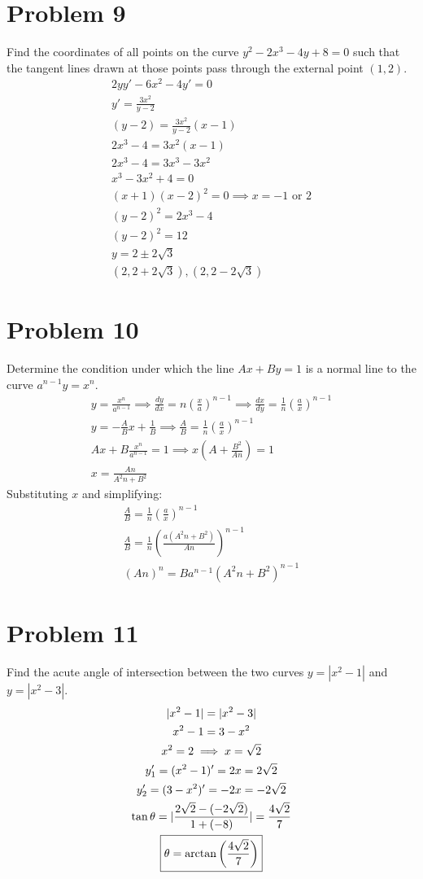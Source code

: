 \documentclass[12pt]{article}
\newcommand*{\paren}[1]{\ensuremath\left(#1\right)}
\newcommand{\dydx}{\frac{dy}{dx}}
\newcommand{\tor}{\text{ or }}
\newcommand{\problem}[1]{\section{Problem #1}}
\begin{document}
\problem{9}
Find the coordinates of all points on the curve $y^2-2x^3-4y+8=0$ such that the tangent lines drawn at those points pass through the external point $(1,2)$.
\begin{gather*}
    2yy'-6x^2-4y'=0\\
    y'=\frac{3x^2}{y-2}\\
    (y-2)=\frac{3x^2}{y-2}(x-1)\\
    2x^3-4=3x^2(x-1)\\
    2x^3-4=3x^3-3x^2\\
    x^3-3x^2+4=0\\ 
    (x+1)(x-2)^2=0 \implies x=-1 \tor 2\\
    (y-2)^2=2x^3-4\\
    (y-2)^2=12\\
    y=2\pm 2\sqrt{3}\\
    \boxed{(2, 2+2\sqrt{3}),(2,2-2\sqrt{3})}
\end{gather*}

\problem{10}
Determine the condition under which the line $Ax+By=1$ is a normal line to the curve $a^{n-1}y=x^n$.
\begin{gather*}
    y=\frac{x^n}{a^{n-1}} \implies \dydx = n(\frac{x}{a})^{n-1}\implies \frac{dx}{dy}=\frac{1}{n} (\frac{a}{x})^{n-1}\\
    y=-\frac{A}{B}x+\frac{1}{B} \implies \frac{A}{B}=\frac{1}{n} (\frac{a}{x})^{n-1}\\
    Ax+B\frac{x^n}{a^{n-1}}=1 \implies x(A+\frac{B^2}{An})=1\\
    x=\frac{An}{A^2n+B^2}
\end{gather*}
Substituting $x$ and simplifying:
\begin{gather*}
    \frac{A}{B}=\frac{1}{n} (\frac{a}{x})^{n-1}\\
    \frac{A}{B}=\frac{1}{n} (\frac{a(A^2n+B^2)}{An})^{n-1}\\
    \boxed{(An)^n=Ba^{n-1}(A^2n+B^2)^{n-1}}
\end{gather*}

\problem{11}
Find the acute angle of intersection between the two curves $y = |x^2 - 1|$ and $y = |x^2 - 3|$.
\begin{gather*}
    |x^2-1|=|x^2-3|\\
    x^2-1=3-x^2\\
    x^2=2 \implies x=\sqrt{2}\\
    y_1'=(x^2-1)'=2x=2\sqrt{2}\\
    y_2'=(3-x^2)'=-2x=-2\sqrt{2}\\
    \tan \theta =|\frac{2\sqrt{2}-(-2\sqrt{2})}{1+(-8)}|=\frac{4\sqrt{2}}{7}\\
    \boxed{\theta = \arctan \paren{\frac{4\sqrt{2}}{7}}}
\end{gather*}
\end{document}
